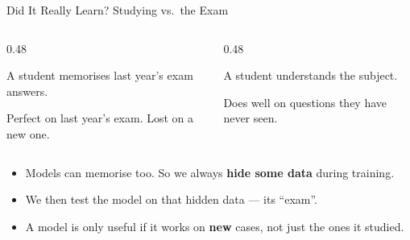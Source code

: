 \begin{frame}{Did It Really Learn? Studying vs.\ the Exam}
    \begin{columns}[T]
        \begin{column}{0.48\textwidth}
            \begin{tcolorbox}[colback=red!5, colframe=red!50, title=\textbf{Memorising}, equal height group=exam]
                \small
                A student memorises last year's exam answers.

                \vspace{0.4em}
                Perfect on last year's exam. Lost on a new one.
            \end{tcolorbox}
        \end{column}
        \begin{column}{0.48\textwidth}
            \begin{tcolorbox}[colback=blue!5, colframe=blue!50, title=\textbf{Understanding}, equal height group=exam]
                \small
                A student understands the subject.

                \vspace{0.4em}
                Does well on questions they have never seen.
            \end{tcolorbox}
        \end{column}
    \end{columns}

    \vspace{0.8em}
    \begin{itemize}
        \setlength\itemsep{0.4em}
        \item Models can memorise too. So we always \textbf{hide some data} during training.
        \item We then test the model on that hidden data --- its ``exam''.
        \item A model is only useful if it works on \textbf{new} cases, not just the ones it studied.
    \end{itemize}
\end{frame}

